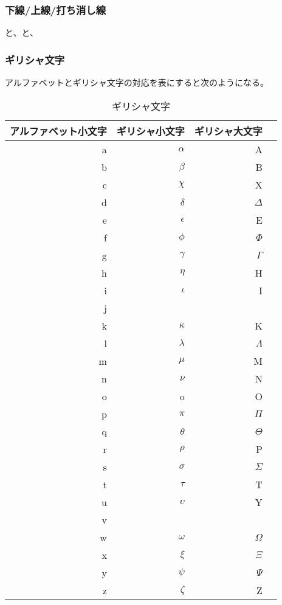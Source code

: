 \subsubsection{下線/上線/打ち消し線}\label{s2:下線/上線/打ち消し線} %
	と、と、
\subsubsection{ギリシャ文字}\label{s2:ギリシャ文字} %
	アルファベットとギリシャ文字の対応を表にすると次のようになる。
	\begin{table}[htbp] %
		\begin{center}\begin{tabular}{rrrr} \hline
			アルファベット小文字 & ギリシャ小文字 & ギリシャ大文字 \\ \hline
			a & $\alpha$ & A \\
			b & $\beta$ & B \\
			c & $\chi$ & X \\
			d & $\delta$ & $\Delta$ \\
			e & $\epsilon$ & E \\
			f & $\phi$ & $\Phi$ \\
			g & $\gamma$ & $\Gamma$ \\
			h & $\eta$ & H \\
			i & $\iota$ & I \\
			j & & \\
			k & $\kappa$ & K \\
			l & $\lambda$ & $\Lambda$ \\
			m & $\mu$ & M \\
			n & $\nu$ & N \\
			o & o & O \\
			p & $\pi$ & $\Pi$ \\
			q & $\theta$ & $\Theta$ \\
			r & $\rho$ & P \\
			s & $\sigma$ & $\Sigma$ \\
			t & $\tau$ & T \\
			u & $\upsilon$ & Y \\
			v & & \\
			w & $\omega$ & $\Omega$ \\
			x & $\xi$ & $\Xi$ \\
			y & $\psi$ & $\Psi$ \\
			z & $\zeta$ & Z \\
		\end{tabular}\end{center}
		\caption{ギリシャ文字}
	\end{table} %

